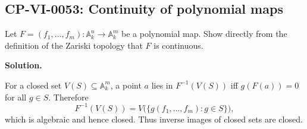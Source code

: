 
\subsection*{CP-VI-0053: Continuity of polynomial maps}

Let $F=(f_1,\dots,f_m):\mathbb A_k^n\to\mathbb A_k^m$ be a polynomial map. Show directly from the definition of the Zariski topology that $F$ is continuous.

\medskip
\noindent\textbf{Solution.}

For a closed set $V(S)\subseteq\mathbb A_k^m$, a point $a$ lies in $F^{-1}(V(S))$ iff $g(F(a))=0$ for all $g\in S$. Therefore
\[
F^{-1}(V(S))=V\bigl(\{g(f_1,\dots,f_m):g\in S\}\bigr),
\]
which is algebraic and hence closed. Thus inverse images of closed sets are closed.
